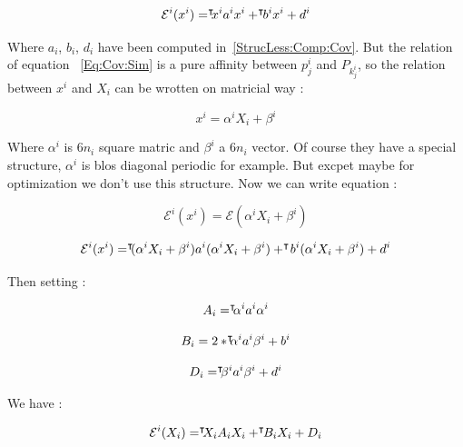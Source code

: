 \begin{equation}
    \mathcal{E}^i (x^i) =    ^{\intercal} \!\!\! {x^i}   a^i x^i  +   ^{\intercal} \!\! {b^i}   x^i   + d^i
\end{equation}

Where $a_i$, $b_i$, $d_i$  have been computed in~\ref{StrucLess:Comp:Cov}.
But the relation of equation ~\ref{Eq:Cov:Sim} is a pure affinity between $p^i_j$
and $P_{k^i_j}$, so the relation between $x^i$ and $X_i$  can be wrotten on matricial way :

\begin{equation}
    x^i =    \alpha^i X_i + \beta^i
\end{equation}

Where $\alpha^i$ is $6n_i$ square matric and $\beta^i$ a $6n_i$ vector.
Of course they have a special structure, $\alpha^i$ is blos diagonal periodic for example.
But excpet maybe for optimization we don't use this structure.
Now we can write equation :

\begin{equation}
    \mathcal{E}^i (x^i) =    \mathcal{E} (\alpha^i X_i + \beta^i)
\end{equation}

\begin{equation}
    \mathcal{E}^i (x^i) =     ^{\intercal} \!\!\! (\alpha^i X_i + \beta^i) a^i (\alpha^i X_i + \beta^i) +  ^{\intercal} \! {b^i}   (\alpha^i X_i + \beta^i)  + d^i
\end{equation}

Then setting :

\begin{equation}
     A_i =     ^{\intercal} \!\!\! \alpha^i  a^i \alpha^i
\end{equation}

\begin{equation}
     B_i =       2*  ^{\intercal} \!\!\! \alpha^i  a^i  \beta^i     + b^i
\end{equation}

\begin{equation}
     D_i =        ^{\intercal} \!\!\! \beta^i  a^i  \beta^i  +        d^i
\end{equation}

We have :

\begin{equation}
    \mathcal{E}^i (X_i) =    ^{\intercal} \!\!\! {X_i}   A_i X_i  +   ^{\intercal} \!\! {B_i}   X_i   + D_i
\end{equation}

